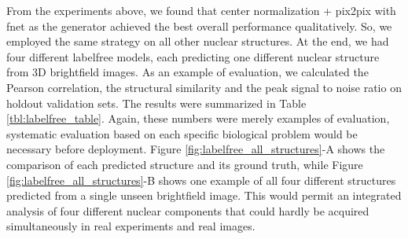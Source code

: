 From the experiments above, we found that center normalization + pix2pix with fnet as the generator achieved the best overall performance qualitatively. So, we employed the same strategy on all other nuclear structures. At the end, we had four different labelfree models, each predicting one different nuclear structure from 3D brightfield images. As an example of evaluation, we calculated the Pearson correlation, the structural similarity and the peak signal to noise ratio on holdout validation sets. The results were summarized in Table \ref{tbl:labelfree_table}. Again, these numbers were merely examples of evaluation, systematic evaluation based on each specific biological problem would be necessary before deployment. Figure \ref{fig:labelfree_all_structures}-A shows the comparison of each predicted structure and its ground truth, while Figure \ref{fig:labelfree_all_structures}-B shows one example of all four different structures predicted from a single unseen brightfield image. This would permit an integrated analysis of four different nuclear components that could hardly be acquired simultaneously in real experiments and real images.

